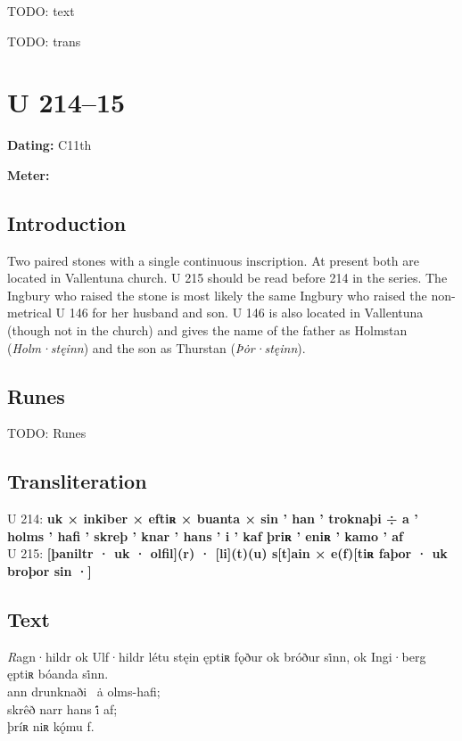 \bpg\bpa[0]%
TODO: text\epa

\bpb TODO: trans\epb\epg

\sectionline\clearpage


\section{U 214--15}

\begin{flushright}%
\textbf{Dating:} C11th

\textbf{Meter:} \Fornyrdislag
\end{flushright}%

\subsection{Introduction}

Two paired stones with a single continuous inscription.  At present both are located in Vallentuna church.  U 215 should be read before 214 in the series.  The Ingbury who raised the stone is most likely the same Ingbury who raised the non-metrical U 146 for her husband and son.  U 146 is also located in Vallentuna (though not in the church) and gives the name of the father as Holmstan (\emph{Holm·stęinn}) and the son as Thurstan (\emph{Þȯr·stęinn}).

\subsection{Runes}

TODO: Runes%

\subsection{Transliteration}

U 214: \textbf{uk × inkiber × eftiʀ × buanta × sin ’ han ’ troknaþi ÷ a ’ holms ’ hafi ’ skreþ ’ knar ’ hans ’ i ’ kaf þriʀ ’ eniʀ ’ kamo ’ af} \\
U 215: \textbf{[þaniltr · uk · olfil](r) · [li](t)(u) s[t]ain × e(f)[tiʀ faþor · uk broþor sin ·]}

\subsection{Text}

\bpg\bpa[0]%
\startsub \emph{R}agn·hildr ok Ulf·hildr létu stęin ęptiʀ fǫður ok bróður si̇nn, ok Ingi·berg ęptiʀ bóanda si̇nn.\endsub \\
ann drunknaði \hld\ ȧ olms-hafi; \\
skrêð narr hans i̇́ af; \\
þríʀ niʀ kǫ́mu f.\epa

